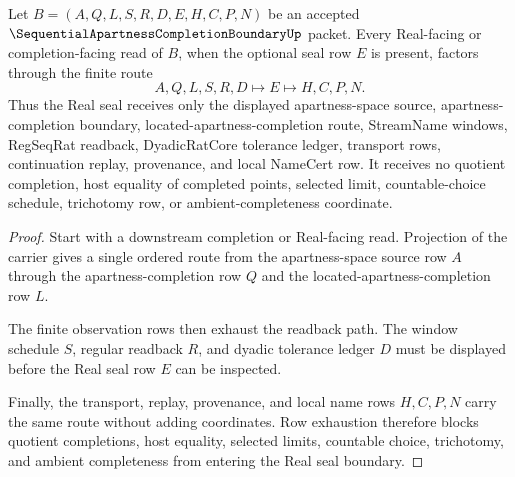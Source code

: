 \begin{theorem}
\label{thm:sequential-apartness-completion-boundary-real-seal-nonescape}
Let $B=(A,Q,L,S,R,D,E,H,C,P,N)$ be an accepted $\SequentialApartnessCompletionBoundaryUp$ packet. Every Real-facing or completion-facing read of $B$, when the optional seal row $E$ is present, factors through the finite route
$$
A,Q,L,S,R,D \longmapsto E \longmapsto H,C,P,N .
$$
Thus the Real seal receives only the displayed apartness-space source, apartness-completion boundary, located-apartness-completion route, StreamName windows, RegSeqRat readback, DyadicRatCore tolerance ledger, transport rows, continuation replay, provenance, and local NameCert row. It receives no quotient completion, host equality of completed points, selected limit, countable-choice schedule, trichotomy row, or ambient-completeness coordinate.
\end{theorem}
\begin{proof}
Start with a downstream completion or Real-facing read. Projection of the carrier gives a single ordered route from the apartness-space source row $A$ through the apartness-completion row $Q$ and the located-apartness-completion row $L$.

The finite observation rows then exhaust the readback path. The window schedule $S$, regular readback $R$, and dyadic tolerance ledger $D$ must be displayed before the Real seal row $E$ can be inspected.

Finally, the transport, replay, provenance, and local name rows $H,C,P,N$ carry the same route without adding coordinates. Row exhaustion therefore blocks quotient completions, host equality, selected limits, countable choice, trichotomy, and ambient completeness from entering the Real seal boundary.
\end{proof}



